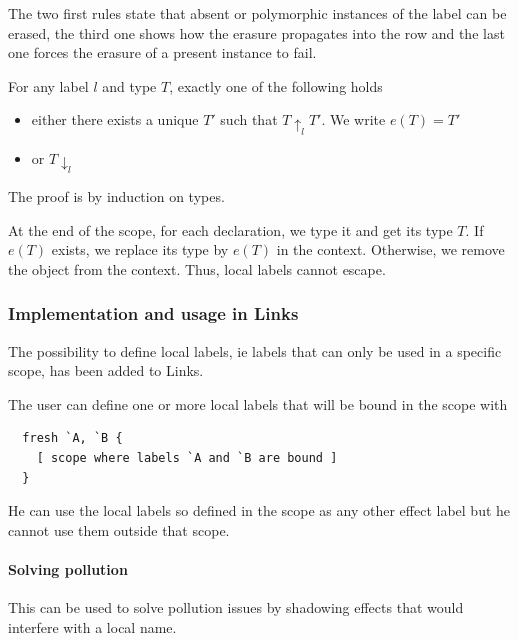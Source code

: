 \documentclass[11pt, nonacm=true, language=french, language=english]{acmart}
\begin{document}
The two first rules state that absent or polymorphic instances of the label can be erased, the third one shows how the erasure propagates into the row and the last one forces the erasure of a present instance to fail.

\begin{thm}
  For any label $l$ and type $T$, exactly one of the following holds
  \begin{itemize}
    \item either there exists a unique $T'$ such that $T\uparrow_{l}T'$. We write $e(T) = T'$
    \item or $T\downarrow_{l}$
  \end{itemize}
\end{thm}

The proof is by induction on types.

At the end of the scope, for each declaration, we type it and get its type $T$. If $e(T)$ exists, we replace its type by $e(T)$ in the context. Otherwise, we remove the object from the context.
Thus, local labels cannot escape.

\subsubsection{Implementation and usage in Links}
\label{sec:impl-usage-links}

The possibility to define local labels, ie labels that can only be used in a specific scope, has been added to Links.

The user can define one or more local labels that will be bound in the scope with
\begin{lstlisting}
  fresh `A, `B {
    [ scope where labels `A and `B are bound ]
  }
\end{lstlisting}

He can use the local labels so defined in the scope as any other effect label but he cannot use them outside that scope.

\paragraph{Solving pollution}
This can be used to solve pollution issues by shadowing effects that would interfere with a local name.
\end{document}
